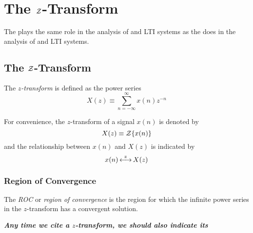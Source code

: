 \section{The \texorpdfstring{$\operatorname{\mathcal{Z}}$-Transform}{Z-Transform}}\label{sec:Z-Transform}
The  plays the same role in the analysis of  and LTI systems as the  does in the analysis of  and LTI systems.

\subsection{The \texorpdfstring{$\operatorname{\mathcal{Z}}$-Transform}{Z-Transform}}\label{subsec:Z-Transform}
\begin{definition}\label{def:Z-Transform}
  The \emph{$z$-transform} is defined as the power series
  \begin{equation}\label{eq:Z-Transform}
    X(z) \equiv \sum_{n=-\infty}^{\infty} x(n)z^{-n}
  \end{equation}

  \begin{remark}
    For convenience, the $z$-transform of a signal $x(n)$ is denoted by
    \begin{equation}\label{eq:Z-Transform Representation}
      X(z) \equiv \operatorname{\mathcal{Z}} \lbrace x(n) \rbrace
    \end{equation}
    and the relationship between $x(n)$ and $X(z)$ is indicated by
    \begin{equation}\label{eq:Z-Transform Relationship}
      x(n) \operatorname{\overset{z}{\longleftrightarrow}} X(z)
    \end{equation}
  \end{remark}
\end{definition}

\subsubsection{Region of Convergence}\label{subsubsec:ROC}
\begin{definition}[ROC]\label{def:ROC}
  The \emph{ROC} or \emph{region of convergence} is the region for which the infinite power series in the $z$-transform has a convergent solution.
  \begin{remark}
    \textbf{\emph{Any time we cite a $z$-transform, we should also indicate its }}
  \end{remark}
\end{definition}

